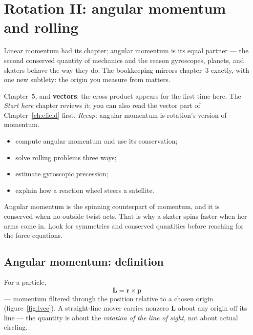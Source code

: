 \chapter{Rotation II: angular momentum and rolling}\label{ch:rot2}

Linear momentum had its chapter; angular momentum is its equal partner ---
the second conserved quantity of mechanics and the reason gyroscopes,
planets, and skaters behave the way they do. The bookkeeping mirrors
chapter~3 exactly, with one new subtlety: the origin you measure from
matters.

\begin{rulebox}
Chapter~5, and \textbf{vectors}: the cross product appears for the first time here. The \emph{Start here} chapter reviews it; you can also read the vector part of Chapter~\ref{ch:efield} first. \emph{Recap:} angular momentum is rotation's version of momentum.
\end{rulebox}
\begin{wins}
\begin{itemize}
\item compute angular momentum and use its conservation;
\item solve rolling problems three ways;
\item estimate gyroscopic precession;
\item explain how a reaction wheel steers a satellite.
\end{itemize}
\end{wins}
\begin{principle}
Angular momentum is the spinning counterpart of momentum, and it is conserved when no outside twist acts. That is why a skater spins faster when her arms come in. Look for symmetries and conserved quantities before reaching for the force equations.
\end{principle}

\section{Angular momentum: definition}\label{sec:ang-l}

For a particle,
\begin{equation}
  \mathbf L=\mathbf r\times\mathbf p\label{eq:ldef}
\end{equation}
--- momentum filtered through the position relative to a chosen origin
(figure~\ref{fig:lvec}). A straight-line mover carries nonzero $\mathbf L$
about any origin off its line --- the quantity is about the
\emph{rotation of the line of sight}, not about actual circling.

